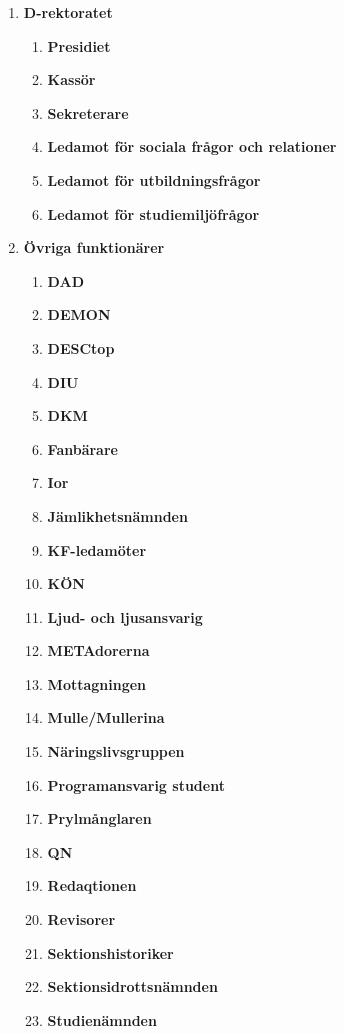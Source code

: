 \documentclass{protokoll}
\begin{document}
  \begin{enumerate}
    \item \textbf{D-rektoratet}
      \begin{enumerate}
        \item \textbf{Presidiet}
        \item \textbf{Kassör}
        \item \textbf{Sekreterare}
        \item \textbf{Ledamot för sociala frågor och relationer}
        \item \textbf{Ledamot för utbildningsfrågor}
        \item \textbf{Ledamot för studiemiljöfrågor}
      \end{enumerate}
    \item \textbf{Övriga funktionärer}
      \begin{enumerate}
      	\item \textbf{DAD}
        \item \textbf{DEMON}
        \item \textbf{DESCtop}
        \item \textbf{DIU}
        \item \textbf{DKM}
        \item \textbf{Fanbärare}
        \item \textbf{Ior}
        \item \textbf{Jämlikhetsnämnden}
        \item \textbf{KF-ledamöter}
        \item \textbf{KÖN}
  			\item \textbf{Ljud- och ljusansvarig}
        \item \textbf{METAdorerna}
        \item \textbf{Mottagningen}
  			\item \textbf{Mulle/Mullerina}
        \item \textbf{Näringslivsgruppen}
        \item \textbf{Programansvarig student}
        \item \textbf{Prylmånglaren}
        \item \textbf{QN}
        \item \textbf{Redaqtionen} 
        \item \textbf{Revisorer}
        \item \textbf{Sektionshistoriker}
        \item \textbf{Sektionsidrottsnämnden}
        \item \textbf{Studienämnden}

\end{enumerate}
\end{enumerate}
\end{document}

